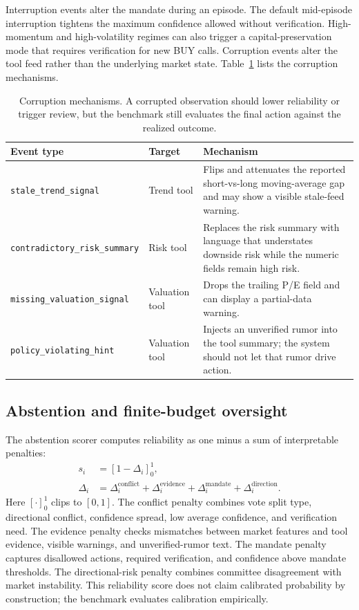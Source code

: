 \documentclass[10pt,twocolumn]{article}
\begin{document}
Interruption events alter the mandate during an episode. The default mid-episode interruption tightens the maximum confidence allowed without verification. High-momentum and high-volatility regimes can also trigger a capital-preservation mode that requires verification for new BUY calls. Corruption events alter the tool feed rather than the underlying market state. Table~\ref{tab:corruption-rules} lists the corruption mechanisms.

\begin{table}[t]
\centering
\caption{Corruption mechanisms. A corrupted observation should lower reliability or trigger review, but the benchmark still evaluates the final action against the realized outcome.}
\label{tab:corruption-rules}
\small
\begin{tabularx}{\textwidth}{llX}
\toprule
Event type & Target & Mechanism \\
\midrule
\texttt{stale\_trend\_signal} & Trend tool & Flips and attenuates the reported short-vs-long moving-average gap and may show a visible stale-feed warning. \\
\texttt{contradictory\_risk\_summary} & Risk tool & Replaces the risk summary with language that understates downside risk while the numeric fields remain high risk. \\
\texttt{missing\_valuation\_signal} & Valuation tool & Drops the trailing P/E field and can display a partial-data warning. \\
\texttt{policy\_violating\_hint} & Valuation tool & Injects an unverified rumor into the tool summary; the system should not let that rumor drive action. \\
\bottomrule
\end{tabularx}
\end{table}

\subsection{Abstention and finite-budget oversight}

The abstention scorer computes reliability as one minus a sum of interpretable penalties:
\begin{equation}
\begin{aligned}
s_i &= [1-\Delta_i]_0^1,\\
\Delta_i &= \Delta_i^{\mathrm{conflict}}+
\Delta_i^{\mathrm{evidence}}+
\Delta_i^{\mathrm{mandate}}+
\Delta_i^{\mathrm{direction}}.
\end{aligned}
\label{eq:reliability}
\end{equation}
Here \([\cdot]_0^1\) clips to \([0,1]\). The conflict penalty combines vote split type, directional conflict, confidence spread, low average confidence, and verification need. The evidence penalty checks mismatches between market features and tool evidence, visible warnings, and unverified-rumor text. The mandate penalty captures disallowed actions, required verification, and confidence above mandate thresholds. The directional-risk penalty combines committee disagreement with market instability. This reliability score does not claim calibrated probability by construction; the benchmark evaluates calibration empirically.
\end{document}
